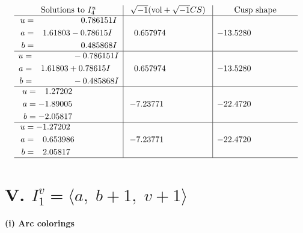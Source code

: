 \documentclass[1p]{elsarticle_modified}
\theoremstyle{definition}
\newcommand{\I}{\sqrt{-1}}
\begin{document}
$$\begin{array}{c|c|c}  
\text{Solutions to }I^u_{4}& \I (\text{vol} + \sqrt{-1}CS) & \text{Cusp shape}\\
 \hline 
\begin{aligned}
u &= \phantom{-0.000000 -}0.786151 I \\
a &= \phantom{-}1.61803 - 0.78615 I \\
b &= \phantom{-0.000000 -}0.485868 I\end{aligned}
 & \phantom{-}0.657974\phantom{ +0.000000I} & -13.5280\phantom{ +0.000000I} \\ \hline\begin{aligned}
u &= \phantom{-0.000000 } -0.786151 I \\
a &= \phantom{-}1.61803 + 0.78615 I \\
b &= \phantom{-0.000000 } -0.485868 I\end{aligned}
 & \phantom{-}0.657974\phantom{ +0.000000I} & -13.5280\phantom{ +0.000000I} \\ \hline\begin{aligned}
u &= \phantom{-}1.27202\phantom{ +0.000000I} \\
a &= -1.89005\phantom{ +0.000000I} \\
b &= -2.05817\phantom{ +0.000000I}\end{aligned}
 & -7.23771\phantom{ +0.000000I} & -22.4720\phantom{ +0.000000I} \\ \hline\begin{aligned}
u &= -1.27202\phantom{ +0.000000I} \\
a &= \phantom{-}0.653986\phantom{ +0.000000I} \\
b &= \phantom{-}2.05817\phantom{ +0.000000I}\end{aligned}
 & -7.23771\phantom{ +0.000000I} & -22.4720\phantom{ +0.000000I}\\
 \hline 
 \end{array}$$\newpage\newpage\renewcommand{\arraystretch}{1}
\centering \section*{V. $I^v_{1}= \langle a,\;b+1,\;v+1 \rangle$}
\flushleft \textbf{(i) Arc colorings}\\
\end{document}

